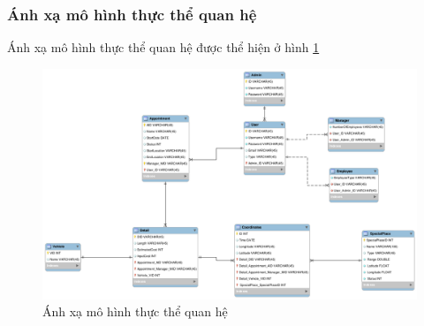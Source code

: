 \documentclass[a4paper]{article}
\begin{document}
\subsubsection{Ánh xạ mô hình thực thể quan hệ}
Ánh xạ mô hình thực thể quan hệ được thể hiện ở hình \ref{fig:erd2}
\begin{figure}
    \includegraphics[scale=0.45]{erd2}
    \caption{Ánh xạ mô hình thực thể quan hệ}
    \label{fig:erd2}
\end{figure}
\clearpage
\end{document}
